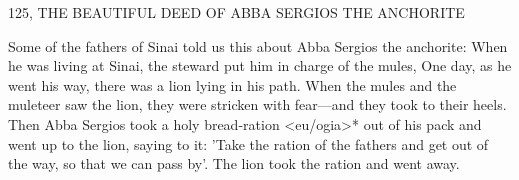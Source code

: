 125, THE BEAUTIFUL DEED OF ABBA SERGIOS
THE ANCHORITE

Some of the fathers of Sinai told us this about Abba Sergios the
anchorite: When he was living at Sinai, the steward put him in
charge of the mules, One day, as he went his way, there was a lion
lying in his path. When the mules and the muleteer saw the lion,
they were stricken with fear—and they took to their heels. Then
Abba Sergios took a holy bread-ration <eu/ogia>* out of his pack
and went up to the lion, saying to it: 'Take the ration of the fathers
and get out of the way, so that we can pass by'. The lion took the
ration and went away.

